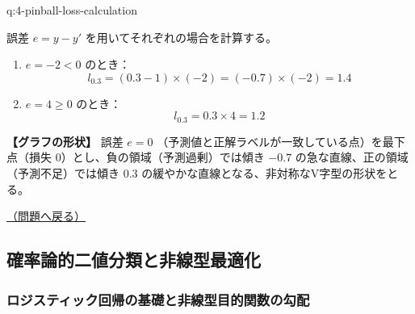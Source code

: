 \documentclass[
  pandoc]{bxjsarticle}
\providecommand{\tightlist}{%
  \setlength{\itemsep}{0pt}\setlength{\parskip}{0pt}}
\begin{document}
\begin{answerbox}[phantomlabel=a:4-pinball-loss-calculation]{q:4-pinball-loss-calculation}

誤差 \(e = y - y'\) を用いてそれぞれの場合を計算する。

\begin{enumerate}
\def\labelenumi{\arabic{enumi}.}
\tightlist
\item
  \(e = -2 < 0\) のとき： \[
       l_{0.3} = (0.3 - 1) \times (-2) = (-0.7) \times (-2) = 1.4
       \]
\item
  \(e = 4 \ge 0\) のとき： \[
       l_{0.3} = 0.3 \times 4 = 1.2
       \]
\end{enumerate}

\textbf{【グラフの形状】} 誤差 \(e=0\)
（予測値と正解ラベルが一致している点）を最下点（損失
\(0\)）とし、負の領域（予測過剰）では傾き \(-0.7\)
の急な直線、正の領域（予測不足）では傾き \(0.3\)
の緩やかな直線となる、非対称なV字型の形状をとる。

\hfill 

\hyperref[q:4-pinball-loss-calculation]{（問題へ戻る）}

\end{answerbox}

\subsection{確率論的二値分類と非線型最適化}\label{ux78baux7387ux8ad6ux7684ux4e8cux5024ux5206ux985eux3068ux975eux7ddaux578bux6700ux9069ux5316-1}

\subsubsection{ロジスティック回帰の基礎と非線型目的関数の勾配}\label{ux30edux30b8ux30b9ux30c6ux30a3ux30c3ux30afux56deux5e30ux306eux57faux790eux3068ux975eux7ddaux578bux76eeux7684ux95a2ux6570ux306eux52feux914d-1}
\end{document}
